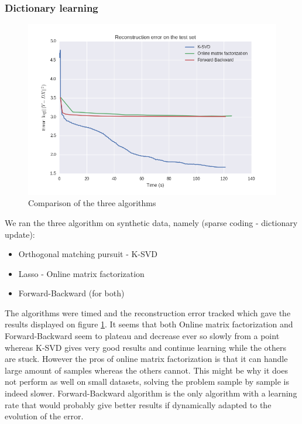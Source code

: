 \documentclass[a4paper,11pt]{article}
\begin{document}
\subsubsection*{Dictionary learning}

\begin{figure}[!htbp]
\centering
  \includegraphics[width=\linewidth]{comparison_120s_synthetic.png}
  \caption{Comparison of the three algorithms}
  \label{comparison}
\end{figure}

We ran the three algorithm on synthetic data, namely (sparse coding - dictionary update):
\begin{itemize}
  \item Orthogonal matching pursuit - K-SVD
  \item Lasso - Online matrix factorization
  \item Forward-Backward (for both)
\end{itemize}
The algorithms were timed and the reconstruction error tracked which gave the results displayed on figure \ref{comparison}.
It seems that both Online matrix factorization and Forward-Backward seem to plateau and decrease ever so slowly from a point whereas K-SVD gives very good results and continue learning while the others are stuck.
However the pros of online matrix factorization is that it can handle large amount of samples whereas the others cannot.
This might be why it does not perform as well on small datasets, solving the problem sample by sample is indeed slower.
Forward-Backward algorithm is the only algorithm with a learning rate that would probably give better results if dynamically adapted to the evolution of the error.
\end{document}

